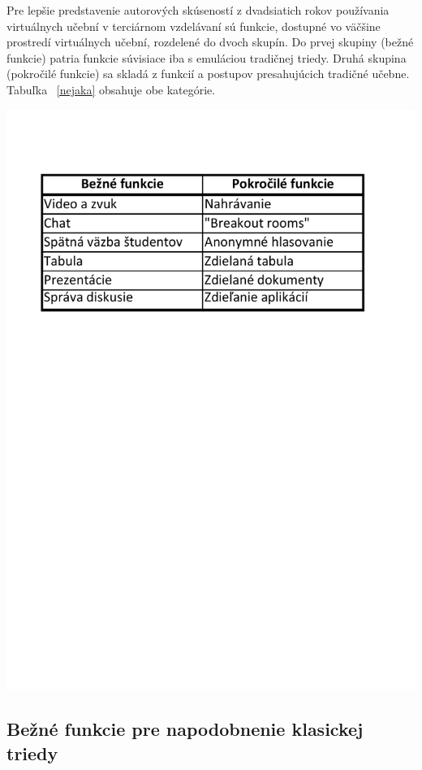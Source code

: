 \documentclass[10pt,twoside,slovak,a4paper]{article}
\begin{document}
Pre lepšie predstavenie autorových skúseností z dvadsiatich rokov používania virtuálnych učební 
v terciárnom vzdelávaní sú funkcie, dostupné vo väčšine prostredí virtuálnych učební, rozdelené do 
dvoch skupín. Do prvej skupiny (bežné funkcie) patria funkcie súvisiace iba s emuláciou tradičnej triedy. 
Druhá skupina (pokročilé funkcie) sa skladá z funkcií a postupov presahujúcich tradičné učebne.\cite{VCf} 
Tabuľka ~\ref{nejaka} obsahuje obe kategórie.

\includegraphics[scale=0.5]{tab1.pdf}\label{tab1}



\subsection{Bežné funkcie pre napodobnenie klasickej triedy} \label{Bezne}
\end{document}

